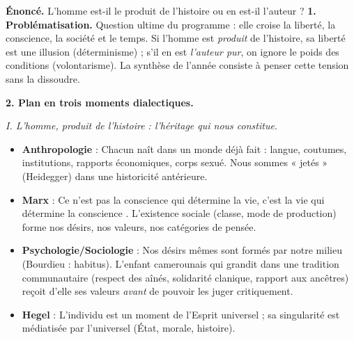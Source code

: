 \documentclass[11pt]{article}
\begin{document}
\begin{exoresolu}
\textbf{Énoncé.} L'homme est-il le produit de l'histoire ou en est-il l'auteur ?
\tcblower
\textbf{1. Problématisation.} Question ultime du programme : elle croise la liberté, la conscience, la société et le temps. Si l'homme est \emph{produit} de l'histoire, sa liberté est une illusion (déterminisme) ; s'il en est \emph{l'auteur pur}, on ignore le poids des conditions (volontarisme). La synthèse de l'année consiste à penser cette tension sans la dissoudre.

\textbf{2. Plan en trois moments dialectiques.}

\emph{I. L'homme, produit de l'histoire : l'héritage qui nous constitue.}
\begin{itemize}
\item \textbf{Anthropologie} : Chacun naît dans un monde déjà fait : langue, coutumes, institutions, rapports économiques, corps sexué. Nous sommes « jetés » (Heidegger) dans une historicité antérieure.
\item \textbf{Marx} : \guillemotleft Ce n'est pas la conscience qui détermine la vie, c'est la vie qui détermine la conscience \guillemotright. L'existence sociale (classe, mode de production) forme nos désirs, nos valeurs, nos catégories de pensée.
\item \textbf{Psychologie/Sociologie} : Nos désirs mêmes sont formés par notre milieu (Bourdieu : habitus). L'enfant camerounais qui grandit dans une tradition communautaire (respect des aînés, solidarité clanique, rapport aux ancêtres) reçoit d'elle ses valeurs \emph{avant} de pouvoir les juger critiquement.
\item \textbf{Hegel} : L'individu est un moment de l'Esprit universel ; sa singularité est médiatisée par l'universel (État, morale, histoire).
\end{itemize}


\end{exoresolu}
\end{document}
